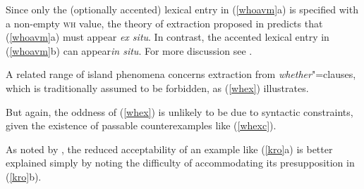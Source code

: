 \documentclass[output=paper
 	        ,biblatex
                ,babelshorthands
                ,newtxmath
                ,draftmode
                ,colorlinks, citecolor=brown
]{langscibook}
\begin{document}
\zl

Since only the (optionally accented) lexical entry in (\ref{whoavm}a) is specified with a non-empty
\textsc{wh} value, the theory of extraction proposed in \citet[Chapter~5]{ginzsag} predicts that (\ref{whoavm}a)
must appear \emph{ex situ}.  In contrast, the accented lexical entry in (\ref{whoavm}b) can
appear\emph{in situ}. For more discussion see \citet[261]{levhubook}.

A related range of island phenomena concerns extraction from \emph{whether}"=clauses, which is
traditionally assumed to be forbidden, as (\ref{whex}) illustrates.

\eal \label{whex}
\zl 

\noindent
But again, the oddness of (\ref{whex}) is unlikely to be due to syntactic constraints, given the
existence of passable counterexamples like (\ref{whexc}).

\eal \label{whexc}
\zl

As noted by \citet[28]{Kroch98a}, the reduced acceptability of an example like (\ref{kro}a) is better
explained simply by noting the difficulty of accommodating its presupposition in (\ref{kro}b).
\end{document}

